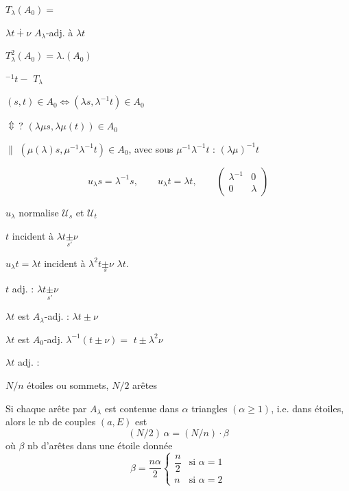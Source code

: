 \documentclass[11pt,a4paper]{article}
\begin{document}
 $T_\lambda(A_0) =$

$\lambda t \dotplus \nu$ $A_\lambda$-adj. à \struck{\ill{}} $\lambda t$

$T_\lambda^{2}(A_0) = \lambda.(A_0)$

\struck{$\lambda$}$^{-1}t -$ \qquad $T_\lambda$

$(s,t)\in A_0 \Longleftrightarrow (\lambda s,\lambda^{-1}t)\in A_0$

$\Updownarrow\,?$ \qquad $(\lambda\mu s, \lambda\mu(t))\in A_0$

$\parallel$ \qquad $(\mu(\lambda)s, \mu^{-1}\lambda^{-1}t)\in A_0$, avec sous $\mu^{-1}\lambda^{-1}t$ : $(\lambda\mu)^{-1}t$

\[
  u_\lambda s = \lambda^{-1}s, \qquad u_\lambda t = \lambda t, \qquad
  \begin{pmatrix}\lambda^{-1} & 0\\ 0 & \lambda\end{pmatrix}
\]

$u_\lambda$ normalise $\mathcal{U}_s$ et $\mathcal{U}_t$

\struck{$\lambda$}$t$ incident à $\lambda t \underset{s'}{\pm}\nu$

$u_\lambda t = \lambda t$ incident à $\lambda^{2}t \underset{s}{\pm}\nu$ \qquad $\lambda t$.

$t$ adj. : $\lambda t \underset{s'}{\pm}\nu$

$\lambda t$ est $A_\lambda$-adj. : $\lambda t\pm\nu$

$\lambda t$ est $A_0$-adj. $\lambda^{-1}(t\pm\nu) = $ \struck{$\lambda$}$t\pm\lambda^{2}\nu$

$\lambda t$ adj. :


$N/n$ étoiles ou sommets, $N/2$ arêtes

Si chaque arête par $A_\lambda$ est contenue dans $\alpha$  triangles $(\alpha\geq1)$, i.e. dans \struck{$\alpha$} étoiles, alors le nb de couples $(a,E)$ est
\[
  (N/2)\,\alpha = (N/n)\cdot\beta
\]
où $\beta$ nb d'arêtes dans une étoile donnée
\[
  \beta = \frac{n\alpha}{2}
  \begin{cases}
    \dfrac{n}{2} & \text{si } \alpha=1 \\
    n & \text{si } \alpha=2
  \end{cases}
\]
\end{document}
